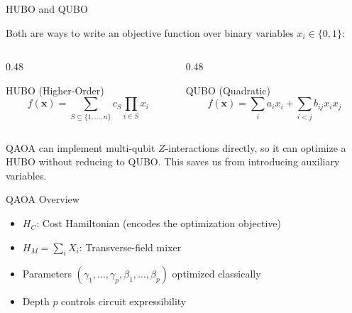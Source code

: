 \documentclass[aspectratio=169]{beamer}
\begin{document}
\begin{frame}{HUBO and QUBO}

Both are ways to write an objective function over binary variables $x_i \in \{0,1\}$:

\bigskip
\begin{columns}
\begin{column}{0.48\textwidth}
\begin{block}{HUBO (Higher-Order)}
$$f(\mathbf{x}) = \sum_{S \subseteq \{1,\ldots,n\}} c_S \prod_{i \in S} x_i$$
\end{block}
\end{column}

\begin{column}{0.48\textwidth}
\begin{block}{QUBO (Quadratic)}
$$f(\mathbf{x}) = \sum_i a_i x_i + \sum_{i<j} b_{ij} x_i x_j$$
\end{block}
\end{column}
\end{columns}

\bigskip
QAOA can implement multi-qubit $Z$-interactions directly, so it can optimize a HUBO without reducing to QUBO. This saves us from introducing auxiliary variables.
\end{frame}

\begin{frame}{QAOA Overview}

\begin{center}
\end{center}

\bigskip
\begin{itemize}
    \item $H_C$: Cost Hamiltonian (encodes the optimization objective)
    \item $H_M = \sum_i X_i$: Transverse-field mixer
    \item Parameters $(\gamma_1,\ldots,\gamma_p, \beta_1,\ldots,\beta_p)$ optimized classically
    \item Depth $p$ controls circuit expressibility
\end{itemize}
\end{frame}
\end{document}
